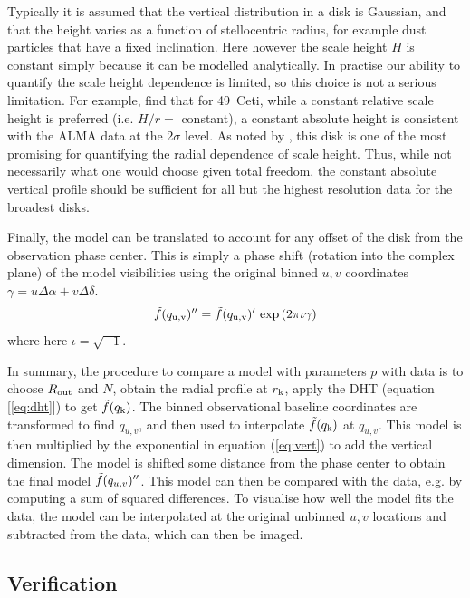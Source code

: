 \documentclass[fleqn,usenatbib]{mnras}
\begin{document}
Typically it is assumed that the  vertical distribution in a disk is Gaussian, and that the height varies as a function of stellocentric radius, for example dust particles that have a fixed inclination. Here however the scale height $H$ is constant simply because it can be modelled analytically. In practise our ability to quantify the scale height dependence is limited, so this choice is not a serious limitation. For example, \citet{2023MNRAS.524.1229T} find that for 49~Ceti, while a constant relative scale height is preferred (i.e. $H/r=$ constant), a constant absolute height is consistent with the ALMA data at the 2$\sigma$ level. As noted by \citet{2023MNRAS.524.1229T}, this disk is one of the most promising for quantifying the radial dependence of scale height. Thus, while not necessarily what one would choose given total freedom, the constant absolute vertical profile should be sufficient for all but the highest resolution data for the broadest disks.

Finally, the model can be translated to account for any offset of the disk from the observation phase center. This is simply a phase shift (rotation into the complex plane) of the model visibilities using the original binned $u,v$ coordinates $\gamma = u \Delta \alpha + v \Delta \delta$.
\begin{equation}\label{eq:phase}
    \Tilde{f}(q_{\rm u,v})'' = \Tilde{f}(q_{\rm u,v})' \, \exp{(2 \pi \iota \gamma)}
\end{equation}
where here $\iota = \sqrt{-1}$.

In summary, the procedure to compare a model with parameters $p$ with data is to choose $R_{\rm out}$ and $N$, obtain the radial profile at $r_{\rm k}$, apply the DHT (equation [\ref{eq:dht}]) to get $\Tilde{f}(q_{\rm k})$. The binned observational baseline coordinates are transformed to find $q_{u,v}$, and then used to interpolate $\Tilde{f}(q_{\rm k})$ at $q_{u,v}$. This model is then multiplied by the exponential in equation (\ref{eq:vert}) to add the vertical dimension. The model is shifted some distance from the phase center to obtain the final model $\Tilde{f}(q_{u,v})''$. This model can then be compared with the data, e.g. by computing a sum of squared differences. To visualise how well the model fits the data, the model can be interpolated at the original unbinned $u,v$ locations and subtracted from the data, which can then be imaged.

\subsection{Verification}
\end{document}

